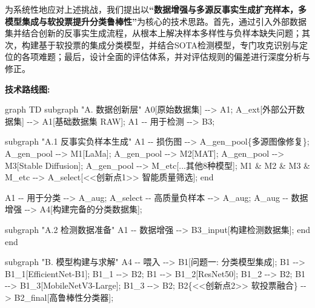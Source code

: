 \documentclass[
]{article}
\newenvironment{Shaded}{}{}
\newcommand{\NormalTok}[1]{#1}
\begin{document}
为系统性地应对上述挑战，我们提出以\textbf{``数据增强与多源反事实生成扩充样本，多模型集成与软投票提升分类鲁棒性''}为核心的技术思路。首先，通过引入外部数据集并结合创新的反事实生成流程，从根本上解决样本多样性与负样本缺失问题；其次，构建基于软投票的集成分类模型，并结合SOTA检测模型，专门攻克识别与定位的各项难题；最后，设计全面的评估体系，并对评估规则的偏差进行深度分析与修正。

\textbf{技术路线图:}

\begin{Shaded}
\begin{Highlighting}[]
\NormalTok{graph TD}
\NormalTok{    subgraph "A. 数据创新层"}
\NormalTok{        A0[原始数据集] {-}{-}\textgreater{} A1;}
\NormalTok{        A\_ext[外部公开数据集] {-}{-}\textgreater{} A1[基础数据集 RAW];}
\NormalTok{        A1 {-}{-} 用于检测 {-}{-}\textgreater{} B3;}

\NormalTok{        subgraph "A.1 反事实负样本生成"}
\NormalTok{            A1 {-}{-} 损伤图 {-}{-}\textgreater{} A\_gen\_pool\{多源图像修复\};}
\NormalTok{            A\_gen\_pool {-}{-}\textgreater{} M1[LaMa];}
\NormalTok{            A\_gen\_pool {-}{-}\textgreater{} M2[MAT];}
\NormalTok{            A\_gen\_pool {-}{-}\textgreater{} M3[Stable Diffusion];}
\NormalTok{            A\_gen\_pool {-}{-}\textgreater{} M\_etc[...其他8种模型];}
\NormalTok{            M1 \& M2 \& M3 \& M\_etc {-}{-}\textgreater{} A\_select[\textless{}\textless{}创新点1\textgreater{}\textgreater{} 智能质量筛选];}
\NormalTok{        end}

\NormalTok{        A1 {-}{-} 用于分类 {-}{-}\textgreater{} A\_aug;}
\NormalTok{        A\_select {-}{-} 高质量负样本 {-}{-}\textgreater{} A\_aug;}
\NormalTok{        A\_aug {-}{-} 数据增强 {-}{-}\textgreater{} A4[构建完备的分类数据集];}

\NormalTok{        subgraph "A.2 检测数据准备"}
\NormalTok{             A1 {-}{-} 数据增强 {-}{-}\textgreater{} B3\_input[构建检测数据集];}
\NormalTok{        end}
\NormalTok{    end}

\NormalTok{    subgraph "B. 模型构建与求解"}
\NormalTok{        A4 {-}{-} 喂入 {-}{-}\textgreater{} B1[问题一: 分类模型集成];}
\NormalTok{        B1 {-}{-}\textgreater{} B1\_1[EfficientNet{-}B1];}
\NormalTok{        B1\_1 {-}{-}\textgreater{} B2;}
\NormalTok{        B1 {-}{-}\textgreater{} B1\_2[ResNet50];}
\NormalTok{        B1\_2 {-}{-}\textgreater{} B2;}
\NormalTok{        B1 {-}{-}\textgreater{} B1\_3[MobileNetV3{-}Large];}
\NormalTok{        B1\_3 {-}{-}\textgreater{} B2;}
\NormalTok{        B2\{\textless{}\textless{}创新点2\textgreater{}\textgreater{} 软投票融合\} {-}{-}\textgreater{} B2\_final[高鲁棒性分类器];}


\end{Highlighting}
\end{Shaded}
\end{document}
